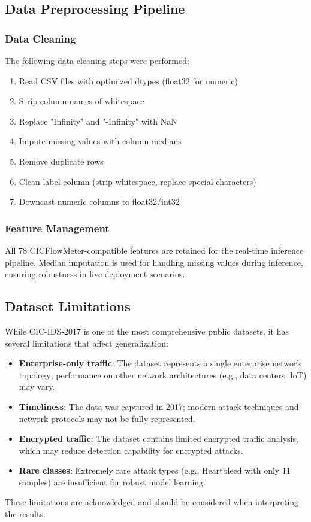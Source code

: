 \documentclass[12pt,a4paper]{article}
\begin{document}
\subsection{Data Preprocessing Pipeline}

\subsubsection{Data Cleaning}

The following data cleaning steps were performed:

\begin{enumerate}
    \item Read CSV files with optimized dtypes (float32 for numeric)
    \item Strip column names of whitespace
    \item Replace "Infinity" and "-Infinity" with NaN
    \item Impute missing values with column medians
    \item Remove duplicate rows
    \item Clean label column (strip whitespace, replace special characters)
    \item Downcast numeric columns to float32/int32
\end{enumerate}

\subsubsection{Feature Management}

All 78 CICFlowMeter-compatible features are retained for the real-time inference pipeline. Median imputation is used for handling missing values during inference, ensuring robustness in live deployment scenarios.

\subsection{Dataset Limitations}

While CIC-IDS-2017 is one of the most comprehensive public datasets, it has several limitations that affect generalization:
\begin{itemize}
    \item \textbf{Enterprise-only traffic}: The dataset represents a single enterprise network topology; performance on other network architectures (e.g., data centers, IoT) may vary.
    \item \textbf{Timeliness}: The data was captured in 2017; modern attack techniques and network protocols may not be fully represented.
    \item \textbf{Encrypted traffic}: The dataset contains limited encrypted traffic analysis, which may reduce detection capability for encrypted attacks.
    \item \textbf{Rare classes}: Extremely rare attack types (e.g., Heartbleed with only 11 samples) are insufficient for robust model learning.
\end{itemize}
These limitations are acknowledged and should be considered when interpreting the results.
\end{document}
